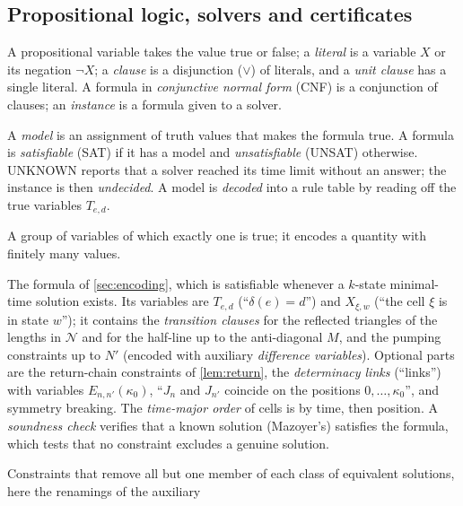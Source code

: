 {\subsection{Propositional logic, solvers and certificates}\label{app:gl-logic}
\begin{description}[style=unboxed,leftmargin=1em,font=\normalfont\bfseries,itemsep=1pt,parsep=0pt,topsep=2pt]
\item[Variable; literal; clause; CNF.] A propositional variable takes
  the value true or false; a \emph{literal} is a variable $X$ or its
  negation $\neg X$; a \emph{clause} is a disjunction ($\vee$) of literals,
  and a \emph{unit clause} has a single literal. A formula in
  \emph{conjunctive normal form} (CNF) is a conjunction of clauses; an
  \emph{instance} is a formula given to a solver.
\item[Model; SAT; UNSAT; UNKNOWN.] A \emph{model} is an assignment of
  truth values that makes the formula true. A formula is
  \emph{satisfiable} (SAT) if it has a model and \emph{unsatisfiable}
  (UNSAT) otherwise. UNKNOWN reports that a solver reached its time limit
  without an answer; the instance is then \emph{undecided}. A model is \emph{decoded} into a rule table by reading
  off the true variables $T_{e,d}$.
\item[One-hot encoding.] A group of variables of which exactly one is
  true; it encodes a quantity with finitely many values.
\item[The formula $\mathrm{MT}_k(\mathcal N;M,N')$.] The formula of
  \cref{sec:encoding}, which is satisfiable whenever a $k$-state
  minimal-time solution exists. Its variables are $T_{e,d}$ (``$\delta(e)=d$'')
  and $X_{\xi,w}$ (``the cell $\xi$ is in state $w$''); it contains the
  \emph{transition clauses} for the reflected triangles of the lengths in
  $\mathcal N$ and for the half-line up to the anti-diagonal $M$, and the
  pumping constraints up to $N'$ (encoded with auxiliary \emph{difference
  variables}). Optional parts are the return-chain constraints of
  \cref{lem:return}, the \emph{determinacy links} (``links'') with
  variables $E_{n,n'}(\kappa_0)$, ``$J_n$ and $J_{n'}$ coincide on the
  positions $0,\dots,\kappa_0$'', and symmetry breaking. The
  \emph{time-major order} of cells is by time, then position. A
  \emph{soundness check} verifies that a known solution (Mazoyer's)
  satisfies the formula, which tests that no constraint excludes a genuine
  solution.
\item[Symmetry breaking.] Constraints that remove all but one member of
  each class of equivalent solutions, here the renamings of the auxiliary

\end{description}}
